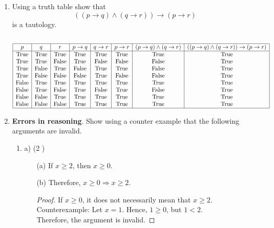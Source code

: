 \documentclass[11pt]{article}
\begin{document}
\begin{enumerate}
\begin{proof}
  \end{proof}
  
\newpage
\item Using a truth table show that
  \[(( p \rightarrow q) \land (q \rightarrow r)) \rightarrow ( p \rightarrow r)\] 
  is a tautology.\\
  \\
  \[
\begin{array}{|c|c|c|c|c|c|c|c|}
\hline
p & q & r & p \rightarrow q & q \rightarrow r & p \rightarrow r & (p \rightarrow q) \land (q \rightarrow r) & ((p \rightarrow q) \land (q \rightarrow r)) \rightarrow (p \rightarrow r) \\
\hline
\text{True} & \text{True} & \text{True} & \text{True} & \text{True} & \text{True} & \text{True} & \text{True} \\
\text{True} & \text{True} & \text{False} & \text{True} & \text{False} & \text{False} & \text{False} & \text{True} \\
\text{True} & \text{False} & \text{True} & \text{False} & \text{True} & \text{True} & \text{False} & \text{True} \\
\text{True} & \text{False} & \text{False} & \text{False} & \text{True} & \text{False} & \text{False} & \text{True} \\
\text{False} & \text{True} & \text{True} & \text{True} & \text{True} & \text{True} & \text{True} & \text{True} \\
\text{False} & \text{True} & \text{False} & \text{True} & \text{False} & \text{True} & \text{False} & \text{True} \\
\text{False} & \text{False} & \text{True} & \text{True} & \text{True} & \text{True} & \text{True} & \text{True} \\
\text{False} & \text{False} & \text{False} & \text{True} & \text{True} & \text{True} & \text{True} & \text{True} \\
\hline
\end{array}
\]


\newpage
\item \textbf{Errors in reasoning}. Show using a counter example that
  the following arguments are invalid.
  \begin{enumerate}
  \item a) (2 ) 

\begin{enumerate}
    \item[(a)] If $x \geq 2$, then $x \geq 0$.
    \item[(b)] Therefore, $x \geq 0 \Rightarrow x \geq 2$.\\
    \begin{proof} If $x \geq 0$, it does not necessarily mean that $x \geq 2$.\\
Counterexample: Let $x = 1$. Hence, $1 \geq 0$, but $1 < 2$.\\
Therefore, the argument is invalid.
\end{proof}
\end{enumerate}\\


\end{enumerate}
\end{enumerate}
\end{document}
